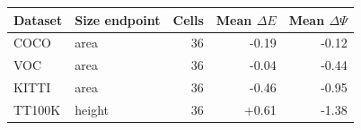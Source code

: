 \begin{tabular}{llrrr}
\toprule
Dataset & Size endpoint & Cells & Mean $\Delta E$ & Mean $\Delta\Psi$ \\
\midrule
COCO & area & 36 & -0.19 & -0.12 \\
VOC & area & 36 & -0.04 & -0.44 \\
KITTI & area & 36 & -0.46 & -0.95 \\
TT100K & height & 36 & +0.61 & -1.38 \\
\bottomrule
\end{tabular}
